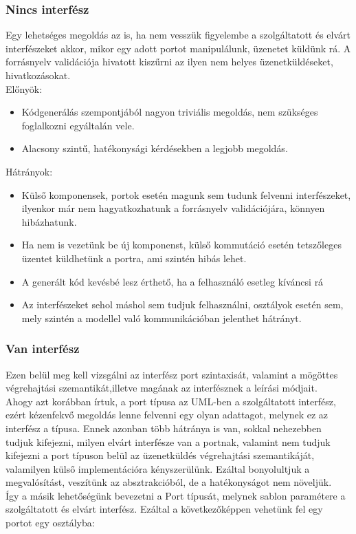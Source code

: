\documentclass[a4paper,12pt]{report}
\begin{document}
\subsubsection{Nincs interfész}
Egy lehetséges megoldás az is, ha nem vesszük figyelembe a szolgáltatott és elvárt interfészeket akkor, mikor egy adott portot manipulálunk, üzenetet küldünk rá. A forrásnyelv validációja hivatott kiszűrni az ilyen nem helyes üzenetküldéseket, hivatkozásokat. \\
Előnyök:
\begin{itemize}
\item Kódgenerálás szempontjából nagyon triviális megoldás, nem szükséges foglalkozni egyáltalán vele.
\item Alacsony szintű, hatékonysági kérdésekben a legjobb megoldás. 
\end{itemize}
Hátrányok:
\begin{itemize}
\item Külső komponensek, portok esetén magunk sem tudunk felvenni interfészeket, ilyenkor már nem hagyatkozhatunk a forrásnyelv validációjára, könnyen hibázhatunk.
\item Ha nem is vezetünk be új komponenst, külső kommutáció esetén tetszőleges üzentet küldhetünk a portra, ami szintén hibás lehet.
\item A generált kód kevésbé lesz érthető, ha a felhasználó esetleg kíváncsi rá
\item Az interfészeket sehol máshol sem tudjuk felhasználni, osztályok esetén sem, mely szintén a modellel való kommunikációban jelenthet hátrányt. 
\end{itemize}

\subsubsection{Van interfész}
Ezen belül meg kell vizsgálni az interfész port szintaxisát, valamint a mögöttes végrehajtási szemantikát,illetve magának az interfésznek a leírási módjait. \\
Ahogy azt korábban írtuk, a port típusa az UML-ben a szolgáltatott interfész, ezért kézenfekvő megoldás lenne felvenni egy olyan adattagot, melynek ez az interfész a típusa. Ennek azonban több hátránya is van, sokkal nehezebben tudjuk kifejezni, milyen elvárt interfésze van a portnak, valamint nem tudjuk kifejezni a port típuson belül az üzenetküldés végrehajtási szemantikáját, valamilyen külső implementációra kényszerülünk. Ezáltal bonyolultjuk a megvalósítást, veszítünk az absztrakcióból, de a hatékonyságot nem növeljük. \\
Így a másik lehetőségünk bevezetni a Port típusát, melynek sablon paramétere a szolgáltatott és elvárt interfész. Ezáltal a következőképpen vehetünk fel egy portot egy osztályba: \\
\end{document}
